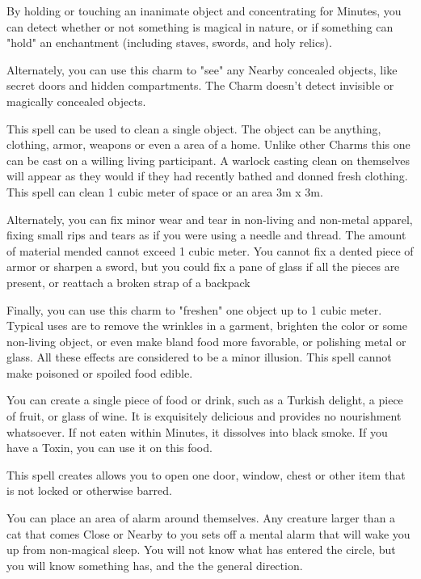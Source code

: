 {  By holding or touching an inanimate object and concentrating for Minutes, you can detect whether or not something is magical in nature, or if something can "hold" an enchantment (including staves, swords, and holy relics).  

  Alternately, you can use this charm to "see" any Nearby concealed objects, like secret doors and hidden compartments.  The Charm doesn't detect invisible or magically concealed objects. 



  This spell can be used to clean a single object. The object can be anything, clothing, armor, weapons or even a area of a home. Unlike other Charms this one can be cast on a willing living participant. A warlock casting clean on themselves will appear as they would if they had recently bathed and donned fresh clothing. This spell can clean 1 cubic meter of space or an area 3m x 3m. 

  Alternately, you can fix minor wear and tear in non-living and non-metal apparel, fixing small rips and tears as if you were using a needle and thread.  The amount of material mended cannot exceed 1 cubic meter.  You cannot fix a dented piece of armor or sharpen a sword, but you could fix a pane of glass if all the pieces are present, or reattach a broken strap of a backpack

  Finally, you can use this charm to "freshen" one object up to 1 cubic meter. Typical uses are to remove the wrinkles in a garment, brighten the color or some non-living object, or even make bland food more favorable, or polishing metal or glass. All these effects are considered to be a minor illusion. This spell cannot make poisoned or spoiled food edible. 


  You can create a single piece of food or drink, such as a Turkish delight, a piece of fruit, or glass of wine. It is exquisitely delicious and provides no nourishment whatsoever. If not eaten within Minutes, it dissolves into black smoke.  If you have a Toxin, you can use it on this food.


  This spell creates allows you to open one door, window, chest or other item that is not locked or otherwise barred. 


  You can place an area of alarm around themselves.  Any creature larger than a cat that comes Close or Nearby to you sets off a mental alarm that will wake you up from non-magical sleep.  You will not know what has entered the circle, but you will know something has, and the the general direction.

}

